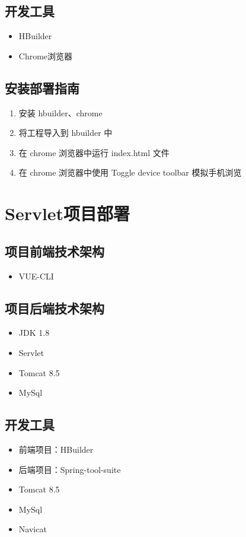 \subsection{开发工具}
    \begin{itemize}
        \item HBuilder
        \item Chrome浏览器
    \end{itemize}
    
\subsection{安装部署指南}
\begin{enumerate}
    \item 安装 hbuilder、chrome
    \item 将工程导入到 hbuilder 中
    \item 在 chrome 浏览器中运行 index.html 文件
    \item 在 chrome 浏览器中使用 Toggle device toolbar 模拟手机浏览
\end{enumerate}

\section{Servlet项目部署}

\subsection{项目前端技术架构}
    \begin{itemize}
        \item VUE-CLI
    \end{itemize}

\subsection{项目后端技术架构}
    \begin{itemize}
        \item JDK 1.8
        \item Servlet
        \item Tomcat 8.5
        \item MySql
    \end{itemize}
    
\subsection{开发工具}
    \begin{itemize}
        \item 前端项目：HBuilder
        \item 后端项目：Spring-tool-suite
        \item Tomcat 8.5
        \item MySql
        \item Navicat
    \end{itemize}

